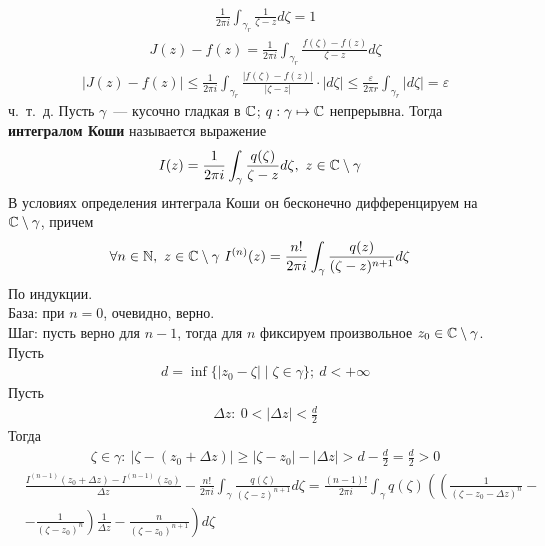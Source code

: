 \begin{align*}
  & \frac{1}{2 \pi i} \int_{\gamma_r} \frac{1}{\zeta - z} d \zeta = 1
\end{align*}
\begin{align*}
  & J(z) - f(z) = \frac{1}{2 \pi i} \int_{\gamma_r} \frac{f(\zeta) - f(z)}{\zeta - z} d \zeta
\end{align*}
\begin{align*}
  & \left| J(z) - f(z) \right| \leq \frac{1}{2 \pi i} \int_{\gamma_r} \frac{\left| f(\zeta) - f(z) \right|}{\left| \zeta - z \right|} \cdot \left| d\zeta \right| \leq \frac{\varepsilon}{2 \pi r} \int_{\gamma_r}\left| d\zeta \right| = \varepsilon
\end{align*}
ч.~т.~д.
\Def
Пусть $\gamma$~--- кусочно гладкая в $\mathbb{C}$; $q: \gamma \mapsto \mathbb{C}$ непрерывна.
Тогда \textbf{интегралом Коши} называется выражение
\begin{equation} \label{(8.2)}
    I(z) = \frac{1}{2 \pi i} \int_{\gamma} \frac{q(\zeta)}{\zeta - z} d\zeta, \ z \in \mathbb{C} \setminus \gamma
\end{equation}
\theorem
В условиях определения интеграла Коши он бесконечно дифференцируем на
$\mathbb{C}\setminus\gamma$, причем
\begin{equation} \label{(8.3)}
    \forall n \in \mathbb{N}, \  z \in \mathbb{C} \setminus \gamma \ I^{(n)}(z) = \frac{n!}{2 \pi i} \int_{\gamma} \frac{q(z)}{(\zeta - z)^{n+1}} d\zeta
\end{equation}
\pr
По индукции.
\\
База: при $n=0$, очевидно, верно.
\\
Шаг: пусть верно для $n-1$, тогда для $n$ фиксируем произвольное $z_0 \in \mathbb{C}
\setminus \gamma$.
\\
Пусть
\begin{align*}
  & d = \inf\{\left| z_0 - \zeta \right| \mid \zeta \in \gamma\}; \ d < +\infty
\end{align*}
Пусть
\begin{align*}
  & \Delta z: \ 0 < \left| \Delta z \right| < \frac{d}{2}
\end{align*}
Тогда
\begin{align*}
  & \zeta \in \gamma: \ \left| \zeta - (z_0+\Delta z)\right| \geq \left| \zeta - z_0 \right| - \left| \Delta z \right| > d - \frac{d}{2} = \frac{d}{2} > 0
\end{align*}
\begin{align*}
  & \frac{I^{(n-1)}(z_0+\Delta z) - I^{(n-1)}(z_0)}{\Delta z} - \frac{n!}{2 \pi i}\int_{\gamma}\frac{q(\zeta)}{(\zeta-z)^{n+1}}d\zeta = \frac{(n-1)!}{2 \pi i}\int_{\gamma}q(\zeta)\left( \left( \frac{1}{(\zeta-z_0-\Delta z)^n} - \right. \right.\\
  & \left. \left. - \frac{1}{(\zeta-z_0)^n} \right)\frac{1}{\Delta z} - \frac{n}{(\zeta-z_0)^{n+1}}\right)d\zeta
\end{align*}
